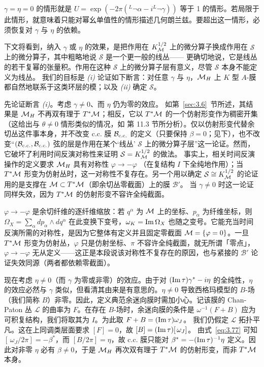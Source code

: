 \bigskip{}

$\gamma=\eta=0$ 的情形就是 $U=\exp(-2\pi(^L\neg
\alpha-i^L\neg \gamma))$ 等于 1 的情形。若局限于此情形，就意味着只能对幂幺单值性的情形描述几何朗兰兹。要超出这一情形，必须恢复对 $\gamma$ 与 $\eta$ 的依赖。

下文将看到，纳入 $\gamma$ 或 $\eta$ 的效果，是把作用在
$K_{\mathcal{M}}^{1/2}$ 上的微分算子换成作用在 ${\mathcal S}$ 上的微分算子，其中粗略地说 ${\mathcal S}$ 是一个更一般的线丛——
更确切地说，它是线丛的若干复幂的张量积。作用在这种
${\mathcal S}$ 上的微分算子层有意义，尽管 ${\mathcal S}$ 本身不能定义为线丛。
我们的目标是
{\it (i)} 论证如下断言：对任意 $\gamma$ 与 $\eta$，${{\mathcal{M}}_H}$ 上 $K$ 型 $A$-膜都自然地联系于这类环层的模；以及 {\it (ii)} 确定 ${\mathcal S}$。

先论证断言 {\it (i)}。考虑 $\gamma\not=0$、而 $\eta$ 仍为零的效应。
如第~\ref{sec:3.6}~节所述，其结果是 ${{\mathcal{M}}_H}$ 不再双有理于 $T^*{\mathcal{M}}$；相反，它以 $T^*{\mathcal{M}}$ 的一个仿射形变作为稠密开集（这给出与 $\theta\not=0$ 情形类似的情况，如 \cite{ref8} 第 11.3 节所分析）。仅以仿射形变代替余切丛这件事本身，并不改变 c.c. 膜
${\mathcal B}_{\rm c.c.}$ 的定义（只要保持 $\beta=0$；见下），也不改变“$({\mathcal B}_{\rm c.c.},{\mathcal B}_{\rm c.c.})$ 弦的层是作用在某个‘线丛’ ${\mathcal S}$ 上的微分算子层”这一论证。然而，它破坏了利用时间反演对称性来证明 ${\mathcal S}=K_{\mathcal{M}}^{1/2}$ 的做法。
事实上，相关时间反演操作的定义要求 ${{\mathcal{M}}_H}$ 具有对称性 $\varphi\to-\varphi$
（在复结构 $I$ 下全纯地作用）；当 $T^*{\mathcal{M}}$ 形变为仿射丛时，这一对称性不复存在。另一个用以确定 ${\mathcal S}\cong K_{\mathcal{M}}^{1/2}$ 的论证用的是支撑在 ${\mathcal{M}}\subset T^*{\mathcal{M}}$（即余切丛零截面）上的膜 ${\mathcal B}'$。
当 $\gamma\not=0$ 时这一论证同样失效，因为 $T^*{\mathcal{M}}$ 的仿射形变不容许全纯截面。

\begin{yizhu}[含糊点拨]
$\varphi\to-\varphi$ 是余切纤维的逐纤维缩放：若 $q^\alpha$ 为 ${\mathcal{M}}$ 上的坐标、$p_\alpha$ 为纤维坐标，则 $\Omega_X=\sum_\alpha dp_\alpha\wedge dq^\alpha$ 在此变换下变号，$\omega_K={\rm Im}\,\Omega_X$ 也随之变号。它能充当时间反演所需的对称性，是因为它整体有定义并且固定零截面 ${\mathcal{M}}=\{\varphi=0\}$。一旦 $T^*{\mathcal{M}}$ 形变为仿射丛，$\varphi$ 只是仿射坐标、$\pi$ 不容许全纯截面，就无所谓「零点」，$\varphi\to-\varphi$ 无从定义——这正是本段说该对称性不复存在的原因，也与紧接的 ${\mathcal B}'$ 论证失效同源（两者都依赖零截面）。
\end{yizhu}

现在考虑 $\eta\not=0$（而 $\gamma$ 为零或非零）的效应。由于对 $({\rm Im}\,\tau)\gamma^*-i\eta$ 的全纯性，$\eta$ 的效应必然与 $\gamma$ 类似，但看清其由来是有意思的。$\eta\not=0$ 导致西格玛模型的 $B$-场（我们简称 $B$）非零。因此，定义典范余迷向膜时需加小心。记该膜的 Chan-Paton 丛 ${\mathcal L}$ 的曲率为 $F$。在存在 $B$-场时，余迷向膜的条件是
$\omega^{-1}(F+B)$ 应为可积复结构，我们将取其为
$I$。为此取 $F+B=({\rm Im}\,\tau)\omega_J$。
我们仍假定 ${\mathcal L}$ 拓扑平凡。这在上同调类层面要求 $[F]=0$，故 $[B]=({\rm Im}\,\tau)[\,\omega_J]$。
由式~\eqref{eq:3.77} 可知 $[\,\omega_J/2\pi]=-\beta^*$，而
$[B/2\pi]=\eta$，故 c.c. 膜只能对
$\beta^*=-({\rm Im}\,\tau)^{-1}\eta$ 定义。因此对非零 $\eta$ 必有 $\beta\not=0$，于是 ${{\mathcal{M}}_H}$ 再次双有理于 $T^*{\mathcal{M}}$ 的仿射形变，而非 $T^*{\mathcal{M}}$ 本身。

